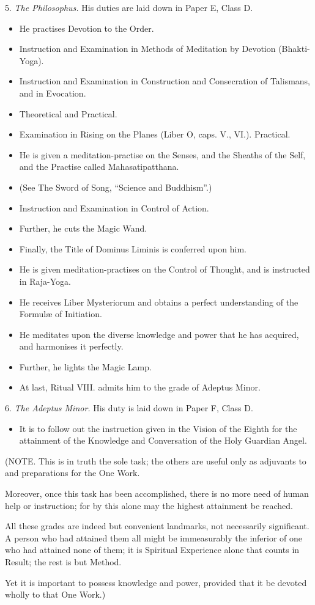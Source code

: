 5. \textit{The Philosophus.} His duties are laid down in Paper E, Class D.
\begin{itemize}
\item He practises Devotion to the Order.
\item Instruction and Examination in Methods of Meditation by Devotion (Bhakti-Yoga).
\item Instruction and Examination in Construction and Consecration of Talismans, and in Evocation.
\item Theoretical and Practical.
\item Examination in Rising on the Planes (Liber O, caps. V., VI.). Practical.
\item He is given a meditation-practise on the Senses, and the Sheaths of the Self, and the Practise called Mahasatipatthana.
\item (See The Sword of Song, \enquote{Science and Buddhism}.)
\item Instruction and Examination in Control of Action.
\item Further, he cuts the Magic Wand.
\item Finally, the Title of Dominus Liminis is conferred upon him.
\item He is given meditation-practises on the Control of Thought, and is instructed in Raja-Yoga.
\item He receives Liber Mysteriorum and obtains a perfect understanding of the Formul\ae{} of Initiation.
\item He meditates upon the diverse knowledge and power that he has acquired, and harmonises it perfectly.
\item Further, he lights the Magic Lamp.
\item At last, Ritual VIII. admits him to the grade of Adeptus Minor.
\end{itemize}

6. \textit{The Adeptus Minor.} His duty is laid down in Paper F, Class D.
\begin{itemize}[label={}]
\item It is to follow out the instruction given in the Vision of the Eighth \AEthyr{} for the attainment of the Knowledge and Conversation of the Holy Guardian Angel.
\end{itemize}

(NOTE. This is in truth the sole task; the others are useful only as adjuvants to and preparations for the One Work.

Moreover, once this task has been accomplished, there is no more need of human help or instruction; for by this alone may the highest attainment be reached.

All these grades are indeed but convenient landmarks, not necessarily significant. A person who had attained them all might be immeasurably the inferior of one who had attained none of them; it is Spiritual Experience alone that counts in Result; the rest is but Method.

Yet it is important to possess knowledge and power, provided that it be devoted wholly to that One Work.)
